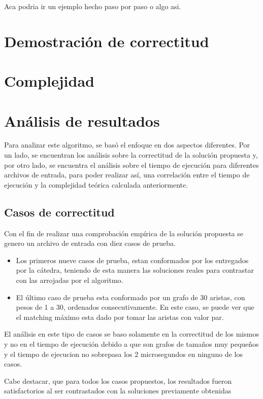 \documentclass[a4paper, 12pt]{article}
\begin{document}
Aca podria ir un ejemplo hecho paso por paso o algo asi.

\section*{Demostraci\'on de correctitud}
\section*{Complejidad}
\section*{An\'alisis de resultados}

Para analizar este algoritmo, se bas\'o el enfoque en dos aspectos diferentes. Por un lado, se encuentran los an\'alisis sobre la correctitud de la soluci\'on propuesta y, por otro lado, se encuentra el an\'alisis sobre el tiempo de ejecuci\'on para diferentes archivos de entrada, para poder realizar as\'i, una correlaci\'on entre el tiempo de ejecuci\'on y la complejidad te\'orica calculada anteriormente.

\subsection*{Casos de correctitud}
Con el fin de realizar una comprobaci\'on emp\'irica de la soluci\'on propuesta se genero un archivo de entrada con diez casos de prueba.
\begin{itemize}
\item Los primeros nueve casos de prueba, estan conformados por los entregados por la c\'atedra, teniendo de esta manera las soluciones reales para contrastar con las arrojadas por el algoritmo.
\item El \'ultimo caso de prueba esta conformado por un grafo de 30 aristas, con pesos de 1 a 30, ordenados consecutivamente. En este caso, se puede ver que el matching m\'aximo esta dado por tomar las aristas con valor par.
\end{itemize}

El an\'alisis en este tipo de casos se baso solamente en la correctitud de los mismos y no en el tiempo de ejecuci\'on debido a que son grafos de tama\~{n}os muy peque\~{n}os y el tiempo de ejecucion no sobrepasa los 2 microsegundos en ninguno de los casos.

Cabe destacar, que para todos los casos propuestos, los resultados fueron satisfactorios al ser contrastados con la soluciones previamente obtenidas
\end{document}
